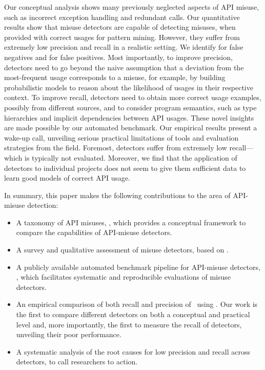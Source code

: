 Our conceptual analysis shows many previously neglected aspects of API misuse, such as incorrect exception handling and redundant calls.
Our quantitative results show that misuse detectors are capable of detecting misuses, when provided with correct usages for pattern mining.
However, they suffer from extremely low precision and recall in a realistic setting. 
%
We identify  for false negatives and  for false positives. 
Most importantly, to improve precision, detectors need to go beyond the naive assumption that a deviation from the most-frequent usage corresponds to a misuse, for example, by building probabilistic models to reason about the likelihood of usages in their respective context.
To improve recall, detectors need to obtain more correct usage examples, possibly from different sources, and to consider program semantics, such as type hierarchies and implicit dependencies between API usages.
%
These novel insights are made possible by our automated benchmark.
Our empirical results present a wake-up call, unveiling serious practical limitations of tools and evaluation strategies from the field.
Foremost, detectors suffer from extremely low recall---which is typically not evaluated. 
Moreover, we find that the application of detectors to individual projects does not seem to give them sufficient data to learn good models of correct API usage.





In summary, this paper makes the following contributions to the area of API-misuse detection:
\begin{itemize}
  \item A taxonomy of API misuses, \MUC, which provides a conceptual framework to compare the capabilities of API-misuse detectors.
  \item A survey and qualitative assessment of  misuse detectors, based on \MUC.
  \item A publicly available automated benchmark pipeline for API-misuse detectors, \MUPipe, which facilitates systematic and reproducible evaluations of misuse detectors.
  \item An empirical comparison of both recall and precision of~ using \MUPipe.
  Our work is the first to compare different detectors on both a conceptual and practical level and, more importantly, the first to measure the recall of detectors, unveiling their poor performance.
  \item A systematic analysis of the root causes for low precision and recall across detectors, to call researchers to action.
\end{itemize}

